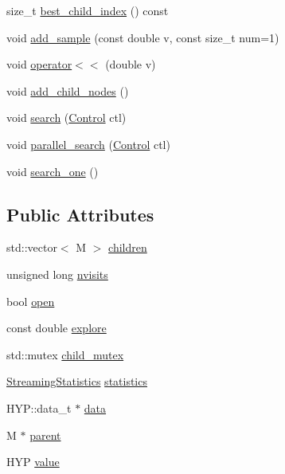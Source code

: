 \begin{DoxyCompactItemize}
\item 
size\+\_\+t \hyperlink{class_m_c_t_s_node_a64290d7134b6841a49e84a244512bd19}{best\+\_\+child\+\_\+index} () const
\item 
void \hyperlink{class_m_c_t_s_node_a1c6a25035bdfd87764072f3a5df16715}{add\+\_\+sample} (const double v, const size\+\_\+t num=1)
\item 
void \hyperlink{class_m_c_t_s_node_ad72e84b8b8c6e814dfae4a697ddb6acd}{operator$<$$<$} (double v)
\item 
void \hyperlink{class_m_c_t_s_node_adf984e74107202a9891e6338eef53ea2}{add\+\_\+child\+\_\+nodes} ()
\item 
void \hyperlink{class_m_c_t_s_node_a0cf85ac07dd2a3f21fea0737834b8cf1}{search} (\hyperlink{struct_control}{Control} ctl)
\item 
void \hyperlink{class_m_c_t_s_node_acd94e02e155886ab71a2922815cd8285}{parallel\+\_\+search} (\hyperlink{struct_control}{Control} ctl)
\item 
void \hyperlink{class_m_c_t_s_node_ad0766d2829bb1cb252dd6aac51ac0d95}{search\+\_\+one} ()
\end{DoxyCompactItemize}
\subsection*{Public Attributes}
\begin{DoxyCompactItemize}
\item 
std\+::vector$<$ M $>$ \hyperlink{class_m_c_t_s_node_a243b348036c57a54af3a48a708851b80}{children}
\item 
unsigned long \hyperlink{class_m_c_t_s_node_a277d083d477ab4aaeeadfadada1cdc24}{nvisits}
\item 
bool \hyperlink{class_m_c_t_s_node_aa4d0f6bb2603cfe995aaafc5d208ec16}{open}
\item 
const double \hyperlink{class_m_c_t_s_node_ad1a742de2cdd0e208079bc35f943cacc}{explore}
\item 
std\+::mutex \hyperlink{class_m_c_t_s_node_a66790ec812754c13bab5f6f14966bacf}{child\+\_\+mutex}
\item 
\hyperlink{class_streaming_statistics}{Streaming\+Statistics} \hyperlink{class_m_c_t_s_node_a68b6340a1b917cda22d8976c9fc4efbe}{statistics}
\item 
H\+Y\+P\+::data\+\_\+t $\ast$ \hyperlink{class_m_c_t_s_node_a736868beae8f1925081e2ec471742b8c}{data}
\item 
M $\ast$ \hyperlink{class_m_c_t_s_node_ab451a032b940daa976b7a5773d3246ca}{parent}
\item 
H\+YP \hyperlink{class_m_c_t_s_node_a0442ab9a9378dabcd98ac7254b2e70a8}{value}
\end{DoxyCompactItemize}


